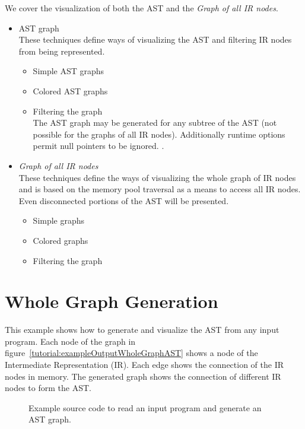 We cover the visualization of both the AST and the {\em Graph of all IR nodes}.
\begin{itemize}
   \item AST graph \\
   These techniques define ways of visualizing the AST and filtering IR nodes from being represented.
   \begin{itemize}
      \item Simple AST graphs
      \item Colored AST graphs
      \item Filtering the graph \\
      The AST graph may be generated for any subtree of the AST (not possible for the
    graphs of all IR nodes).  Additionally runtime options permit null pointers to be
    ignored. .
   \end{itemize}
   \item {\em Graph of all IR nodes} \\
   These techniques define the ways of visualizing the whole graph of IR nodes and is
    based on the memory pool traversal as a means to access all IR nodes.  Even
    disconnected portions of the AST will be presented.
   \begin{itemize}
      \item Simple graphs
      \item Colored graphs
      \item Filtering the graph
   \end{itemize}
\end{itemize}


\section{Whole Graph Generation}

This example shows how to generate and visualize the AST from any input program.
Each node of the graph in figure~\ref{tutorial:exampleOutputWholeGraphAST} shows
a node of the Intermediate Representation (IR).  Each edge shows the connection
of the IR nodes in memory. The generated graph shows the connection of different 
IR nodes to form the AST.

\begin{figure}[!h]
{\indent
{\mySmallFontSize

\begin{latexonly}
   
\end{latexonly}

\begin{htmlonly}
   
\end{htmlonly}

}
}
\caption{Example source code to read an input program and generate an AST graph.}
\label{Tutorial:exampleWholeGraphAST}
\end{figure}

